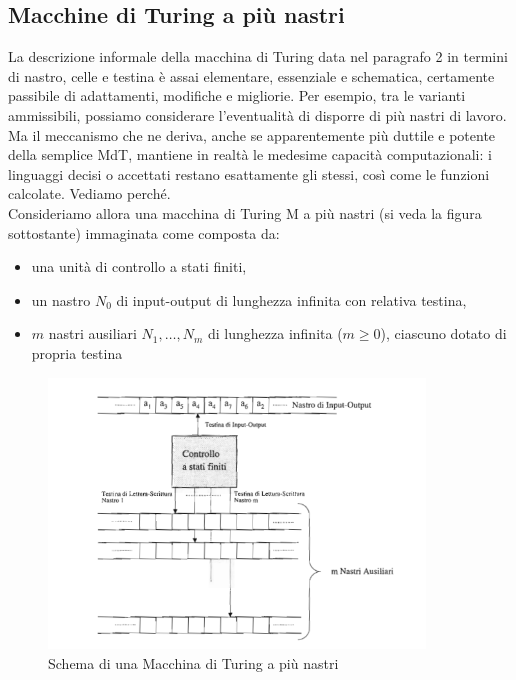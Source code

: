 \subsection{Macchine di Turing a più nastri}

La descrizione informale della macchina di Turing data nel paragrafo 2 in termini di
nastro, celle e testina è assai elementare, essenziale e schematica, certamente
passibile di adattamenti, modifiche e migliorie. Per esempio, tra le varianti
ammissibili, possiamo considerare l'eventualità di disporre di più nastri di lavoro.
Ma il meccanismo che ne deriva, anche se apparentemente più duttile e potente della
semplice MdT, mantiene in realtà le medesime capacità computazionali: i linguaggi
decisi o accettati restano esattamente gli stessi, così come le funzioni calcolate.
Vediamo perché.\\
Consideriamo allora una macchina di Turing M a più nastri (si veda la figura
sottostante) immaginata come composta da:

\begin{itemize}
    \item una unità di controllo a stati finiti,
    \item un nastro $N_0$ di input-output di lunghezza infinita con relativa testina,
    \item $m$ nastri ausiliari $N_1, \ldots, N_m$ di lunghezza infinita ($m \ge 0$),
          ciascuno dotato di propria testina
\end{itemize}

\begin{figure}[H]
    \centering
    \includegraphics[width=10cm, keepaspectratio]{capitoli/le_macchine_di_turing/imgs/mdt_piu_nastri.png}
    \caption{Schema di una Macchina di Turing a più nastri}
\end{figure}

